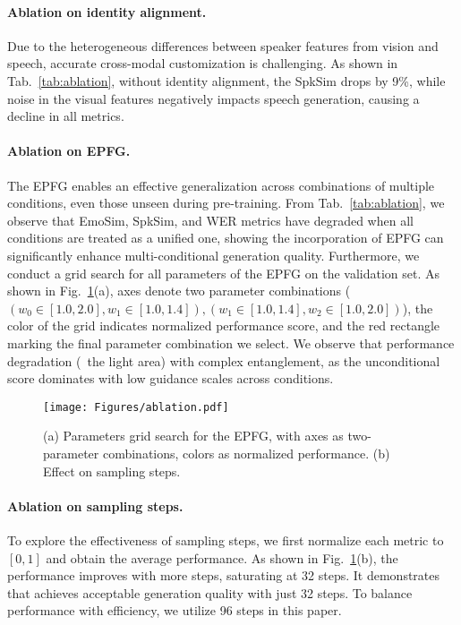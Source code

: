 
\paragraph{Ablation on identity alignment.~~\xspace}
Due to the heterogeneous differences between speaker features from vision and speech, accurate cross-modal customization is challenging. As shown in Tab.~\ref{tab:ablation}, without identity alignment, the SpkSim drops by 9\%, while noise in the visual features negatively impacts speech generation, causing a decline in all metrics.


\paragraph{Ablation on EPFG.~~\xspace}
The EPFG enables an effective generalization across combinations of multiple conditions, even those unseen during pre-training. From Tab.~\ref{tab:ablation}, we observe that EmoSim, SpkSim, and WER metrics have degraded when all conditions are treated as a unified one, showing the incorporation of EPFG can significantly enhance multi-conditional generation quality. 
Furthermore, we conduct a grid search for all parameters of the EPFG on the validation set. As shown in Fig.~\ref{fig:timestep}(a), axes denote two parameter combinations (\ie~$(w_0\in[1.0,2.0],w_1\in[1.0,1.4]),(w_1\in[1.0,1.4],w_2\in[1.0,2.0])$), the color of the grid indicates normalized performance score, and the red rectangle marking the final parameter combination we select. 
We observe that performance degradation (\ie~the light area) with complex entanglement, as the unconditional score dominates with low guidance scales across conditions.

\begin{figure}[t]
    \centering
        \texttt{[image: Figures/ablation.pdf]}
    \caption{(a) Parameters grid search for the EPFG, with axes as two-parameter combinations, colors as normalized performance. (b) Effect on sampling steps.}
    \label{fig:timestep}
\end{figure}




\paragraph{Ablation on sampling steps.~~\xspace}
To explore the effectiveness of sampling steps, we first normalize each metric to $[0,1]$ and obtain the average performance. 
As shown in Fig.~\ref{fig:timestep}(b), the performance improves with more steps, saturating at 32 steps. It demonstrates that \methodname achieves acceptable generation quality with just 32 steps. To balance performance with efficiency, we utilize 96 steps in this paper.